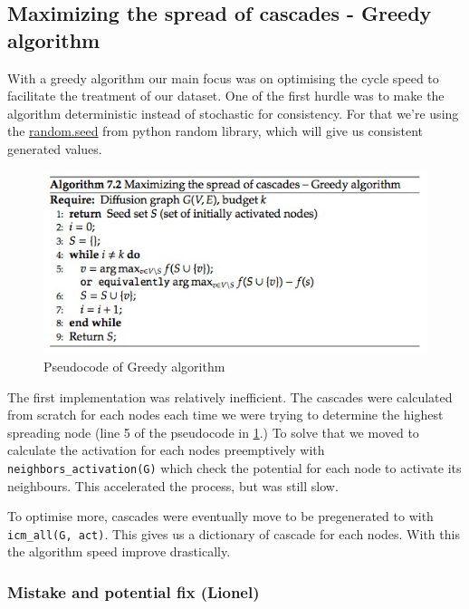 \subsection{Maximizing the spread of cascades - Greedy algorithm}

With a greedy algorithm our main focus was on optimising the cycle speed to facilitate the treatment of our dataset.
One of the first hurdle was to make the algorithm deterministic instead of stochastic for consistency. For that we're using the \href{https://docs.python.org/3.8/library/random.html#random.seed}{random.seed} from python random library, which will give us consistent generated values.

\begin{figure}[H]
    \centering
    \includegraphics[width=0.8\linewidth]{Report/images/greedy_pseudo.png}
    \caption{Pseudocode of Greedy algorithm}
    \label{fig:greedy_pseudo}
\end{figure}

\noindent The first implementation was relatively inefficient. The cascades were calculated from scratch for each nodes each time we were trying to determine the highest spreading node (line 5 of the pseudocode in \ref{fig:greedy_pseudo}.)
To solve that we moved to calculate the activation for each nodes preemptively with \texttt{neighbors\_activation(G)} which check the potential for each node to activate its neighbours.
This accelerated the process, but was still slow. 

To optimise more, cascades were eventually move to be pregenerated to with \texttt{icm\_all(G, act)}. This gives us a dictionary of cascade for each nodes. With this the algorithm speed improve drastically.



\subsubsection*{Mistake and potential fix (Lionel)}

